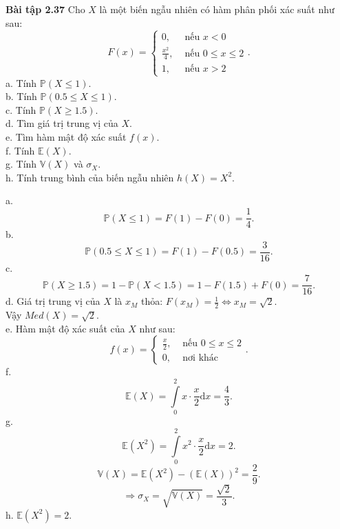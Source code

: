 \documentclass[12pt,a4paper]{article}
\begin{document}
\begin{mybox}
    \textbf{Bài tập 2.37} Cho $X$ là một biến ngẫu nhiên có hàm phân phối xác suất như sau:
    $$F \left( x \right) = 
    \begin{cases}
        0, &\text{ nếu } x < 0\\
        \frac{x^2}{4}, &\text{ nếu } 0 \leqslant x \leqslant 2\\
        1, &\text{ nếu } x > 2
    \end{cases}
    .$$
    a. Tính $\mathbb{P} \left( {X \leqslant 1} \right).$\\
    b. Tính $\mathbb{P} \left( {0.5 \leqslant X \leqslant 1} \right).$\\
    c. Tính $\mathbb{P} \left( {X \geqslant 1.5} \right).$\\
    d. Tìm giá trị trung vị của $X.$\\
    e. Tìm hàm mật độ xác suất $f \left( x \right).$\\
    f. Tính $\mathbb{E} \left( X \right).$\\
    g. Tính $\mathbb{V} \left( X \right)$ và $\sigma_X.$\\
    h. Tính trung bình của biến ngẫu nhiên $h \left( X \right) = X^2.$
\end{mybox} 
a. $$\mathbb{P} \left( {X \leqslant 1} \right) = F \left( 1 \right) - F \left( 0 \right) = \frac{1}{4}.$$
b. $$\mathbb{P} \left( {0.5 \leqslant X \leqslant 1} \right) = F \left( 1 \right) - F \left( {0.5} \right) = \frac{3}{16}.$$
c. $$\mathbb{P} \left( {X \geqslant 1.5} \right) = 1 - \mathbb{P} \left( {X < 1.5} \right) = 1 - F \left( {1.5} \right) + F \left( 0 \right) = \frac{7}{16}.$$
d. Giá trị trung vị của $X$ là $x_M$ thỏa: $F \left( {x_M} \right) = \frac{1}{2} \Leftrightarrow x_M = \sqrt{2}.$\\
Vậy $Med \left( X \right) = \sqrt{2}.$\\
e. Hàm mật độ xác suất của $X$ như sau:
$$f \left( x \right) = 
\begin{cases}
    \frac{x}{2}, &\text{ nếu } 0 \leqslant x \leqslant 2\\
    0, &\text{ nơi khác }
\end{cases}
.$$
f. $$\mathbb{E} \left( X \right) = \int\limits_0^2{x \cdot \frac{x}{2} \mathrm{d}x} = \frac{4}{3}.$$
g. $$\mathbb{E} \left( {X^2} \right) = \int\limits_0^2{x^2 \cdot \frac{x}{2} \mathrm{d}x} = 2.$$
$$\mathbb{V} \left( X \right) = \mathbb{E} \left( {X^2} \right) - \left( {\mathbb{E} \left( X \right)} \right)^2 = \frac{2}{9}.$$
$$\Rightarrow \sigma_X = \sqrt{\mathbb{V} \left( X \right)} = \frac{\sqrt{2}}{3}.$$
h. $\mathbb{E} \left( {X^2} \right) = 2.$
\end{document}
